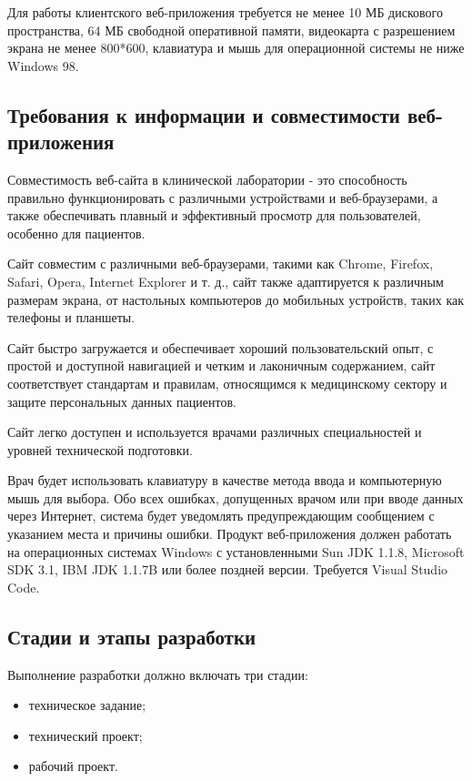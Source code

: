 Для работы клиентского веб-приложения требуется не менее 10 МБ дискового пространства, 64 МБ свободной оперативной памяти, видеокарта с разрешением экрана не менее 800*600, клавиатура и мышь для операционной системы не ниже Windows 98.

\subsection{Требования к информации и совместимости веб-приложения}

Совместимость веб-сайта в клинической лаборатории - это способность правильно функционировать с различными устройствами и веб-браузерами, а также обеспечивать плавный и эффективный просмотр для пользователей, особенно для пациентов.

Сайт совместим с различными веб-браузерами, такими как Chrome, Firefox, Safari, Opera, Internet Explorer и т. д., сайт также адаптируется к различным размерам экрана, от настольных компьютеров до мобильных устройств, таких как телефоны и планшеты.

Сайт быстро загружается и обеспечивает хороший пользовательский опыт, с простой и доступной навигацией и четким и лаконичным содержанием, сайт соответствует стандартам и правилам, относящимся к медицинскому сектору и защите персональных данных пациентов.

Сайт легко доступен и используется врачами различных специальностей и уровней технической подготовки.

Врач будет использовать клавиатуру в качестве метода ввода и компьютерную мышь для выбора.
Обо всех ошибках, допущенных врачом или при вводе данных через Интернет, система будет уведомлять предупреждающим сообщением с указанием места и причины ошибки.
Продукт веб-приложения должен работать на операционных системах Windows с установленными Sun JDK 1.1.8, Microsoft SDK 3.1, IBM JDK 1.1.7B или более поздней версии. Требуется Visual Studio Code.

\subsection{Стадии и этапы разработки}

Выполнение разработки должно включать три стадии: 

\begin{itemize}
	\item техническое задание;
	\item технический проект;
	\item рабочий проект.
\end{itemize}

